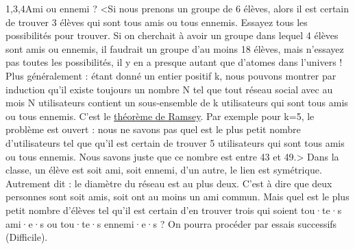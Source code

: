 \begin{quiz}[title={Réseaux sociaux}]
\begin{quizquestion*}[t]{2}{1,3,4}{Ami ou ennemi ?}
<Si nous prenons un groupe de 6 élèves, alors il est certain de trouver 3 élèves qui sont tous amis ou tous ennemis.
Essayez tous les possibilités pour trouver. Si on cherchait à avoir un groupe dans lequel 4 élèves sont amis ou ennemis, il faudrait un groupe d'au moins 18 élèves, mais n'essayez pas toutes les possibilités, il y en a presque autant que d'atomes dans l'univers !
Plus généralement : étant donné un entier positif k, nous pouvons montrer par induction qu'il existe toujours un nombre N tel que tout réseau social avec au mois N utilisateurs contient un sous-ensemble de k utilisateurs qui sont tous amis ou tous ennemis. C'est le \href{https://fr.wikipedia.org/wiki/Th\%C3\%A9or\%C3\%A8me_de_Ramsey}{théorème de Ramsey}. Par exemple pour k=5, le problème est ouvert : nous ne savons pas quel est le plus petit nombre d'utilisateurs tel que qu'il est certain de trouver 5 utilisateurs qui sont tous amis ou tous ennemis. Nous savons juste que ce nombre est entre 43 et 49.>
Dans la classe, un élève est soit ami, soit ennemi, d'un autre, le lien est symétrique. Autrement dit : le diamètre du réseau est au plus deux. C’est à dire que deux personnes sont soit amis, soit ont au moins un ami commun. Mais quel est le plus petit nombre d'élèves tel qu'il est certain d'en trouver trois qui soient tou·te·s ami·e·s ou tou·te·s ennemi·e·s ?
On pourra procéder par essais successifs (Difficile).
\end{quizquestion*}


\end{quiz}

